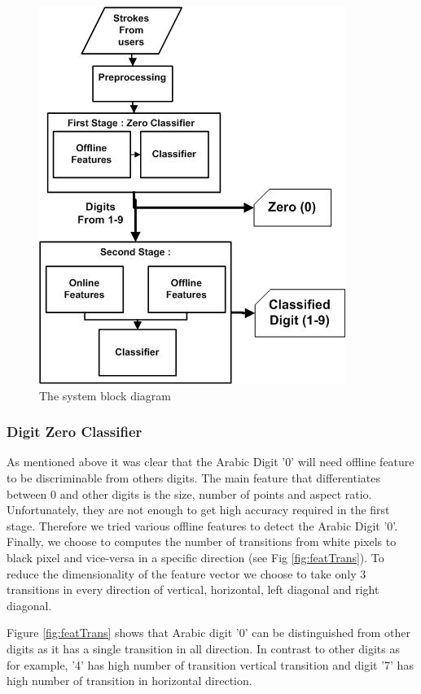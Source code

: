 \documentclass[10pt]{IEEEtran}
\begin{document}
 \begin{figure}
	\centering
		\includegraphics[scale=0.45]{Block}
	\caption[System Block Diagram] {The system block diagram}
	\label{fig:flowChart}
\end{figure}


\subsubsection{Digit Zero Classifier }
\label{sec:DigitZeroClassifier}


As mentioned above it was clear that the Arabic Digit '0' will need offline feature to be discriminable from others digits. The main feature that differentiates between 0 and other digits is the size, number of points and aspect ratio. Unfortunately, they are not enough to get high accuracy required in the first stage. Therefore we tried various offline features to detect the Arabic Digit '0'. Finally, we choose to computes the number of transitions from white pixels to black pixel and vice-versa in a specific direction (see Fig \ref{fig:featTrans}). To reduce the dimensionality of the feature vector we choose to take only 3 transitions in every direction of vertical, horizontal, left diagonal and right diagonal.

   Figure \ref{fig:featTrans} shows that Arabic digit '0' can be distinguished from other digits as it has a single transition in all direction. In contrast to other digits as for example, '4' has high number of transition vertical transition and digit '7' has high number of transition in horizontal direction.
\end{document}
